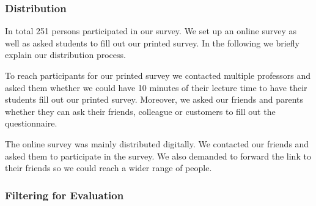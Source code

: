\subsubsection{Distribution}
In total 251 persons participated in our survey.
 We set up an online survey as well as asked students to fill out our printed survey.
 In the following we briefly explain our distribution process.


\begin{description}[leftmargin=0cm]
	\item[Printed Survey] To reach participants for our printed survey we contacted multiple professors and asked them whether we could have 10 minutes of their lecture time to have their students fill out our printed survey.
 Moreover, we asked our friends and parents whether they can ask their friends, colleague or customers to fill out the questionnaire.

	\item[Online Survey] The online survey was mainly distributed digitally.
 We contacted our friends and asked them to participate in the survey.
 We also demanded to forward the link to their friends so we could reach a wider range of people.

\end{description}

\subsubsection{Filtering for Evaluation}

